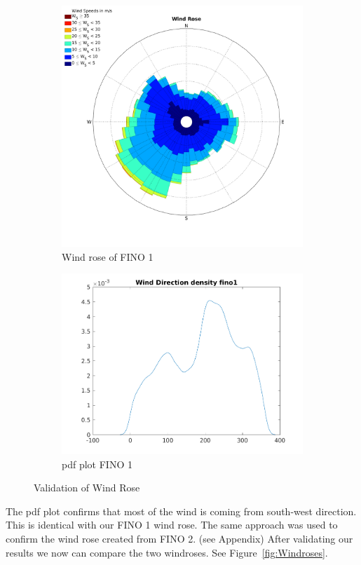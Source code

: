 \documentclass[10pt]{article}
\begin{document}
\begin{figure}[htb!]

\begin{subfigure}{0.5\textwidth}
  \centering
  \includegraphics[width=1\linewidth]{../figures/WindRose_Fino1.png}
  \caption{Wind rose of FINO 1}
\end{subfigure}
\begin{subfigure}{0.5\textwidth}
  \centering
  \includegraphics[width=1\linewidth]{../figures/Validation_WindRose_Fino1.png}
  \caption{pdf plot FINO 1}
\end{subfigure}
  \caption{Validation of Wind Rose}
\label{fig:WindroseValidation}
\end{figure}
\newpage
The pdf plot confirms that most of the wind is coming from south-west direction. This is identical with our FINO 1 wind rose. The same approach was used to confirm the wind rose created from FINO 2. (see Appendix)
After validating our results we now can compare the two windroses. See Figure~\ref{fig:Windroses}.
\end{document}
